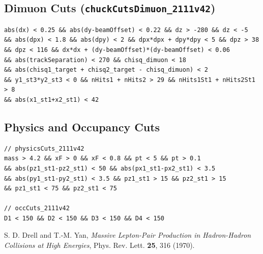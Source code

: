 \documentclass[11pt]{article}
\begin{document}
\subsection{Dimuon Cuts (\texttt{chuckCutsDimuon\_2111v42})}
\label{cut:chuck_dimuon}
{\small\begin{verbatim}
abs(dx) < 0.25 && abs(dy-beamOffset) < 0.22 && dz > -280 && dz < -5
&& abs(dpx) < 1.8 && abs(dpy) < 2 && dpx*dpx + dpy*dpy < 5 && dpz > 38
&& dpz < 116 && dx*dx + (dy-beamOffset)*(dy-beamOffset) < 0.06
&& abs(trackSeparation) < 270 && chisq_dimuon < 18
&& abs(chisq1_target + chisq2_target - chisq_dimuon) < 2
&& y1_st3*y2_st3 < 0 && nHits1 + nHits2 > 29 && nHits1St1 + nHits2St1 > 8
&& abs(x1_st1+x2_st1) < 42
\end{verbatim}}

\subsection{Physics and Occupancy Cuts}
\label{cut:physics_occ}
{\small\begin{verbatim}
// physicsCuts_2111v42
mass > 4.2 && xF > 0 && xF < 0.8 && pt < 5 && pt > 0.1
&& abs(pz1_st1-pz2_st1) < 50 && abs(px1_st1-px2_st1) < 3.5
&& abs(py1_st1-py2_st1) < 3.5 && pz1_st1 > 15 && pz2_st1 > 15
&& pz1_st1 < 75 && pz2_st1 < 75

// occCuts_2111v42
D1 < 150 && D2 < 150 && D3 < 150 && D4 < 150
\end{verbatim}}

\begin{thebibliography}{99}
    S. D. Drell and T.-M. Yan,
    \textit{Massive Lepton-Pair Production in Hadron-Hadron Collisions at High Energies},
    Phys. Rev. Lett. \textbf{25}, 316 (1970).
\end{thebibliography}
\end{document}
